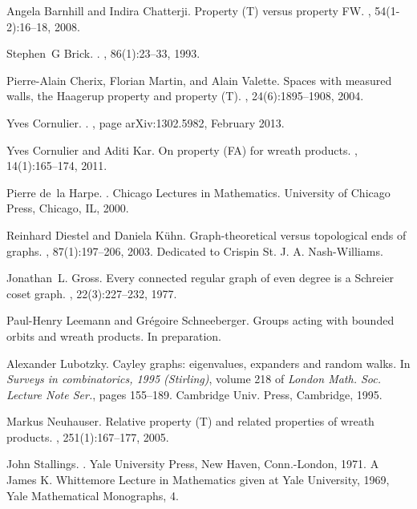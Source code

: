 \documentclass[a4paper]{article}
\theoremstyle{definition}
\theoremstyle{remark}%
\begin{document}
\begin{thebibliography}{10}

Angela Barnhill and Indira Chatterji.
\newblock Property ({T}) versus property {FW}.
, 54(1-2):16--18, 2008.

Stephen~G Brick.
.
, 86(1):23--33, 1993.

Pierre-Alain Cherix, Florian Martin, and Alain Valette.
\newblock Spaces with measured walls, the {H}aagerup property and property
  ({T}).
, 24(6):1895--1908, 2004.

Yves {Cornulier}.
.
, page arXiv:1302.5982, February 2013.

Yves Cornulier and Aditi Kar.
\newblock On property ({FA}) for wreath products.
, 14(1):165--174, 2011.

Pierre de~la Harpe.
.
\newblock Chicago Lectures in Mathematics. University of Chicago Press,
  Chicago, IL, 2000.

Reinhard Diestel and Daniela K\"{u}hn.
\newblock Graph-theoretical versus topological ends of graphs.
, 87(1):197--206, 2003.
\newblock Dedicated to Crispin St. J. A. Nash-Williams.

Jonathan~L. Gross.
\newblock Every connected regular graph of even degree is a {S}chreier coset
  graph.
, 22(3):227--232, 1977.

Paul-Henry Leemann and Gr{\'e}goire Schneeberger.
\newblock Groups acting with bounded orbits and wreath products.
\newblock In preparation.

Alexander Lubotzky.
\newblock Cayley graphs: eigenvalues, expanders and random walks.
\newblock In {\em Surveys in combinatorics, 1995 ({S}tirling)}, volume 218 of
  {\em London Math. Soc. Lecture Note Ser.}, pages 155--189. Cambridge Univ.
  Press, Cambridge, 1995.

Markus Neuhauser.
\newblock Relative property ({T}) and related properties of wreath products.
, 251(1):167--177, 2005.

John Stallings.
.
\newblock Yale University Press, New Haven, Conn.-London, 1971.
\newblock A James K. Whittemore Lecture in Mathematics given at Yale
  University, 1969, Yale Mathematical Monographs, 4.

\end{thebibliography}
%
%
%
%
%
\enddocument
\end{document}
